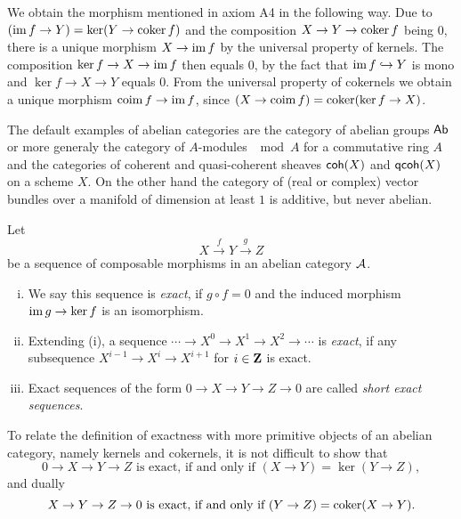 \begin{remark}
    We obtain the morphism mentioned in axiom A4 in the following way. Due to $(\operatorname{im} f \to Y) = \ker(Y \to \operatorname{coker} f)$ and the composition $X \to Y \to \operatorname{coker} f$ being $0$, there is a unique morphism $X \to \operatorname{im} f$ by the universal property of kernels. The composition $\ker f \to X \to \operatorname{im} f$ then equals $0$, by the fact that $\operatorname{im} f \hookrightarrow Y$ is mono and $\ker f \to X \to Y$ equals $0$. From the universal property of cokernels we obtain a unique morphism $\operatorname{coim} f \to \operatorname{im} f$, since $(X \to \operatorname{coim} f) = \operatorname{coker}(\ker f \to X)$.
\end{remark}

\begin{example}
    The default examples of abelian categories are the category of abelian groups $\mathsf{Ab}$ or more generaly the category of $A$-modules $\mod{A}$ for a commutative ring $A$ and the categories of coherent and quasi-coherent sheaves $\mathsf{coh}(X)$ and $\mathsf{qcoh}(X)$ on a scheme $X$. On the other hand the category of (real or complex) vector bundles over a manifold of dimension at least $1$ is additive, but never abelian.
\end{example}

\begin{definition}
    Let
    \[
        X \xrightarrow{\ f \ } Y \xrightarrow{\ g\ } Z
    \]
    be a sequence of composable morphisms in an abelian category $\mathcal A$.  
    \begin{enumerate}[(i)]    
        \item We say this sequence is \emph{exact}, if $g \circ f = 0$ and the induced morphism $\operatorname{im} g \to \ker f$ is an isomorphism.

        \item Extending (i), a sequence $\cdots \to X^0 \to X^1 \to X^2 \to \cdots$ is \emph{exact}, if any subsequence $X^{i-1} \to X^i \to X^{i+1}$ for $i \in \mathbf Z$ is exact. 
        \item Exact sequences of the form $0 \to X \to Y \to Z \to 0$ are called \emph{short exact sequences}.
    \end{enumerate}
\end{definition}

To relate the definition of exactness with more primitive objects of an abelian category, namely kernels and cokernels, it is not difficult to show that
\[
    0 \to X \to Y \to Z \text{ is exact, if and only if } (X \to Y) = \ker(Y \to Z),
\]
and dually
\[
    X \to Y \to Z \to 0 \text{ is exact, if and only if } (Y \to Z) = \operatorname{coker}(X \to Y).
\]

